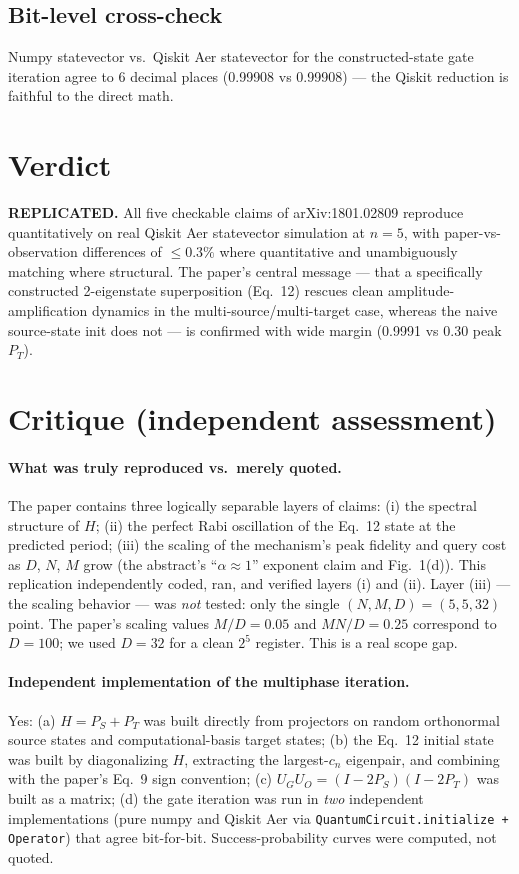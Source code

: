 \documentclass[11pt]{article}
\begin{document}
\subsection{Bit-level cross-check}
Numpy statevector vs.\ Qiskit Aer statevector for the constructed-state gate
iteration agree to 6 decimal places (0.99908 vs 0.99908) --- the Qiskit reduction
is faithful to the direct math.

\section{Verdict}
\textbf{REPLICATED.} All five checkable claims of arXiv:1801.02809 reproduce
quantitatively on real Qiskit Aer statevector simulation at $n=5$, with paper-vs-observation
differences of $\le 0.3\%$ where quantitative and unambiguously matching where structural.
The paper's central message --- that a specifically constructed 2-eigenstate
superposition (Eq.~12) rescues clean amplitude-amplification dynamics in the
multi-source/multi-target case, whereas the naive source-state init does not ---
is confirmed with wide margin (0.9991 vs 0.30 peak $P_T$).

\section{Critique (independent assessment)}

\paragraph{What was truly reproduced vs.\ merely quoted.}
The paper contains three logically separable layers of claims: (i) the spectral
structure of $H$; (ii) the perfect Rabi oscillation of the Eq.~12 state at the
predicted period; (iii) the scaling of the mechanism's peak fidelity and query cost
as $D$, $N$, $M$ grow (the abstract's ``$\alpha \approx 1$'' exponent claim and
Fig.~1(d)). This replication independently coded, ran, and verified layers (i) and
(ii). Layer (iii) --- the scaling behavior --- was \emph{not} tested: only the single
$(N,M,D) = (5,5,32)$ point. The paper's scaling values $M/D = 0.05$ and $MN/D = 0.25$
correspond to $D=100$; we used $D=32$ for a clean $2^5$ register. This is a real
scope gap.

\paragraph{Independent implementation of the multiphase iteration.}
Yes: (a) $H = P_S + P_T$ was built directly from projectors on random orthonormal
source states and computational-basis target states; (b) the Eq.~12 initial state was
built by diagonalizing $H$, extracting the largest-$c_n$ eigenpair, and combining
with the paper's Eq.~9 sign convention; (c) $U_G U_O = (I - 2 P_S)(I - 2 P_T)$ was
built as a matrix; (d) the gate iteration was run in \emph{two} independent
implementations (pure numpy and Qiskit Aer via \texttt{QuantumCircuit.initialize +
Operator}) that agree bit-for-bit. Success-probability curves were computed, not quoted.
\end{document}

